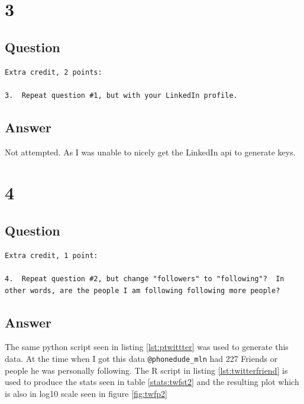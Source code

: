 \documentclass[letterpaper,10pt]{article}
\begin{document}
 
 

\newpage
 
\section*{3}

\subsection*{Question}

\begin{verbatim}
Extra credit, 2 points:

3.  Repeat question #1, but with your LinkedIn profile.
\end{verbatim}
\subsection*{Answer}

Not attempted. As I was unable to nicely get the LinkedIn api to generate keys.

\newpage
\section*{4}
\subsection*{Question}
\begin{verbatim}
Extra credit, 1 point:

4.  Repeat question #2, but change "followers" to "following"?  In
other words, are the people I am following following more people?
\end{verbatim}
\subsection*{Answer}
The same python script seen in listing \ref{lst:ptwittter} was used to generate this data. At the time when I got this data \verb+@phonedude_mln+ had 227 Friends or people he was personally following. 
The R script in listing \ref{lst:twitterfriend} is used to produce the stats seen in table \ref{stats:twfst2} and the resulting plot which is also in log10 scale seen in figure \ref{fig:twfp2}
\end{document}
